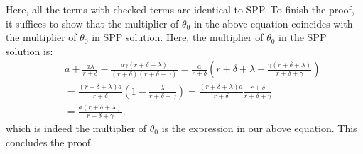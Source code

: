 \documentclass[12pt]{article} %
\theoremstyle{definition}
\begin{document}
Here, all the terms with checked terms are identical to SPP. To finish the proof, it suffices to show that the multiplier of $\theta_0$ in the above equation coincides with the multiplier of $\theta_0$ in SPP solution. Here, the multiplier of $\theta_0$ in the SPP solution is: 
\begin{eqnarray*}
&& a + \frac{a\lambda}{r+\delta} - \frac{a\gamma(r+\delta+\lambda)}{(r+\delta)(r+\delta+\gamma)} = \frac{a}{r+\delta} \left(r+\delta+\lambda-\frac{\gamma(r+\delta+\lambda)}{r+\delta+\gamma} \right) \\
&& = \frac{(r+\delta+\lambda)a}{r+\delta}\left(1-\frac{\lambda}{r+\delta+\gamma}\right) = \frac{(r+\delta+\lambda)a}{r+\delta}\frac{r+\delta}{r+\delta+\gamma} \\
&& = \frac{a(r+\delta+\lambda)}{r+\delta+\gamma}, 
\end{eqnarray*}
which is indeed the multiplier of $\theta_0$ is the  expression in our above equation. This concludes the proof.  
\end{document}
